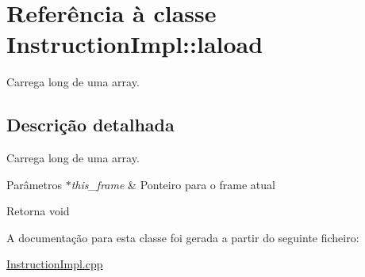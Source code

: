 \hypertarget{class_instruction_impl_1_1laload}{}\section{Referência à classe Instruction\+Impl\+:\+:laload}
\label{class_instruction_impl_1_1laload}


Carrega long de uma array.  




\subsection{Descrição detalhada}
Carrega long de uma array. 


\begin{DoxyParams}{Parâmetros}
{\em $\ast$this\+\_\+frame} & Ponteiro para o frame atual \\
\hline
\end{DoxyParams}
\begin{DoxyReturn}{Retorna}
void 
\end{DoxyReturn}


A documentação para esta classe foi gerada a partir do seguinte ficheiro\+:\begin{DoxyCompactItemize}
\item 
\hyperlink{_instruction_impl_8cpp}{Instruction\+Impl.\+cpp}\end{DoxyCompactItemize}
